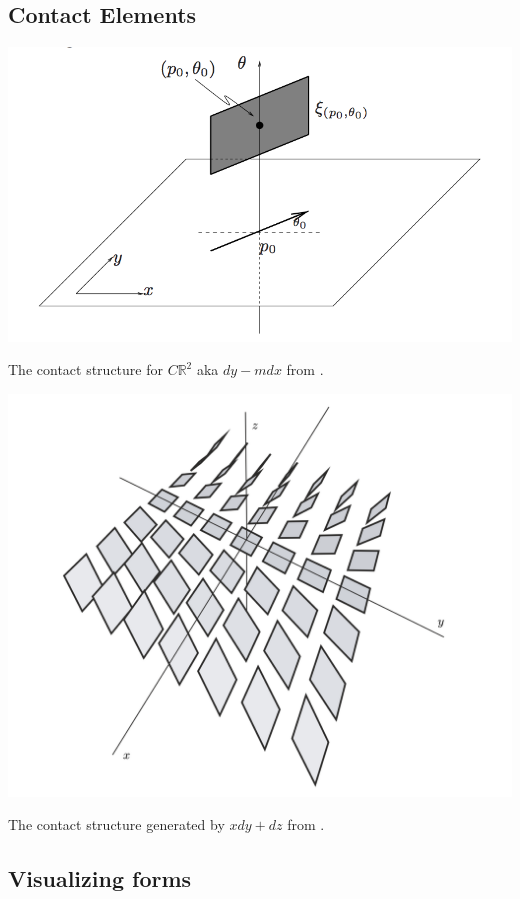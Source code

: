 \documentclass{article}
\begin{document}
\subsection {Contact Elements}

\includegraphics[scale=0.8]{geiges_contact_structure}

The contact structure for $C\mathbb{R}^{2}$ aka $dy - mdx$ from \cite{geiges}.

\includegraphics[scale=0.3]{contact_elements_bachman}

The contact structure generated by $xdy + dz$ from \cite{bachman}.

\subsection {Visualizing forms}
\end{document}
